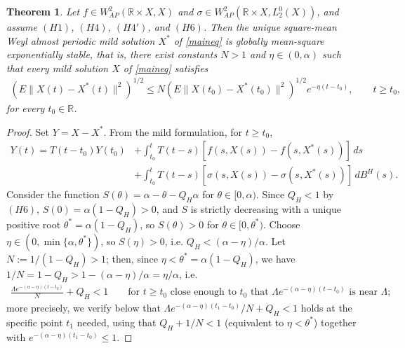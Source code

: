 \documentclass[11pt]{amsart}
\newtheorem{theorem}{Theorem}[section]
\begin{document}
\begin{theorem}\label{stab1}
Let $f\in W^2_{AP}(\mathbb R\times X,X)$ and $\sigma\in W^2_{AP}(\mathbb R\times X,L^0_2(X))$, and assume $(H1)$, $(H4)$, $(H4')$, and $(H6)$. Then the unique square-mean Weyl almost periodic mild solution $X^\ast$ of \eqref{maineq} is globally mean-square exponentially stable, that is, there exist constants $N>1$ and $\eta\in(0,\alpha)$ such that every mild solution $X$ of \eqref{maineq} satisfies
\begin{align*}
\left(E\|X(t)-X^\ast(t)\|^2\right)^{1/2}\le N\left(E\|X(t_0)-X^\ast(t_0)\|^2\right)^{1/2}e^{-\eta(t-t_0)},\qquad t\ge t_0,
\end{align*}
for every $t_0\in\mathbb R$.
\end{theorem}

\begin{proof}
Set $Y=X-X^\ast$. From the mild formulation, for $t\ge t_0$,
\begin{align*}
Y(t)=T(t-t_0)Y(t_0)&+\int_{t_0}^t T(t-s)[f(s,X(s))-f(s,X^\ast(s))]\,ds\\
&+\int_{t_0}^t T(t-s)[\sigma(s,X(s))-\sigma(s,X^\ast(s))]\,dB^H(s).
\end{align*}
Consider the function $S(\theta)=\alpha-\theta-Q_H\alpha$ for $\theta\in[0,\alpha)$. Since $Q_H<1$ by $(H6)$, $S(0)=\alpha(1-Q_H)>0$, and $S$ is strictly decreasing with a unique positive root $\theta^\ast=\alpha(1-Q_H)$, so $S(\theta)>0$ for $\theta\in[0,\theta^\ast)$. Choose $\eta\in(0,\min\{\alpha,\theta^\ast\})$, so $S(\eta)>0$, i.e. $Q_H<(\alpha-\eta)/\alpha$. Let $N:=1/(1-Q_H)>1$; then, since $\eta<\theta^\ast=\alpha(1-Q_H)$, we have $1/N=1-Q_H>1-(\alpha-\eta)/\alpha=\eta/\alpha$, i.e.
\begin{align*}
\frac{\Lambda e^{-(\alpha-\eta)(t-t_0)}}N+Q_H<1\qquad\text{for }t\ge t_0\text{ close enough to }t_0\text{ that }\Lambda e^{-(\alpha-\eta)(t-t_0)}\text{ is near }\Lambda;
\end{align*}
more precisely, we verify below that $\Lambda e^{-(\alpha-\eta)(t_1-t_0)}/N+Q_H<1$ holds at the specific point $t_1$ needed, using that $Q_H+1/N<1$ (equivalent to $\eta<\theta^\ast$) together with $e^{-(\alpha-\eta)(t_1-t_0)}\le1$.


\end{proof}
\end{document}
